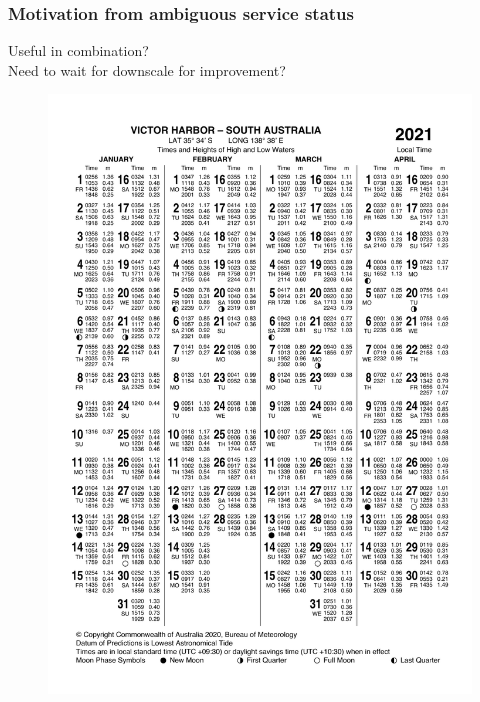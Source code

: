\begin{frame}
\frametitle{Motivation from ambiguous service status}
Useful in combination?\\
Need to wait for downscale for improvement?
\begin{minipage}{0.45\textwidth}
    \begin{figure}      
    \includegraphics[trim={0 8cm 0 0},clip,height=\textheight]{figures/images/IDO59001_2021_SA_TP006.pdf}
    \end{figure}
\end{minipage}
\hfill
\begin{minipage}{0.45\textwidth}
    \begin{figure}      

\end{figure}
\end{minipage}
\end{frame}
